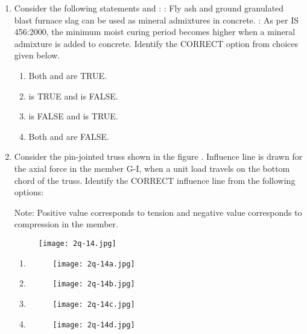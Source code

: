 \documentclass[journal,12pt,onecolumn]{article}
\theoremstyle{remark}
\begin{document}
\begin{enumerate}
    \item Consider the following statements  and :
    : Fly ash and ground granulated blast furnace slag can be used as mineral admixtures in concrete.
    : As per IS 456:2000, the minimum moist curing period becomes higher when a mineral admixture is added to concrete.
    Identify the CORRECT option from choices given below.

    \hfill{}
    \begin{enumerate}
        \item Both  and  are TRUE.
        \item {} is TRUE and  is FALSE.
        \item {} is FALSE and  is TRUE.
        \item Both  and  are FALSE.
    \end{enumerate}

    \item Consider the pin-jointed truss shown in the figure . Influence line is drawn for the axial force in the member G-I, when a unit load travels on the bottom chord of the truss. Identify the CORRECT influence line from the following options:
    
    Note: Positive value corresponds to tension and negative value corresponds to compression in the member.
    \begin{figure}[H]
        \centering
        \texttt{[image: 2q-14.jpg]}
        \caption{}
        \label{fig:q14}
    \end{figure}

    \hfill{}
    \begin{enumerate}
        \item \begin{figure}[H]
        \centering
        \texttt{[image: 2q-14a.jpg]}
        \caption{}
        \label{fig:q14}
    \end{figure}
    \item \begin{figure}[H]
        \centering
        \texttt{[image: 2q-14b.jpg]}
        \caption{}
        \label{fig:q14}
    \end{figure}
    \item \begin{figure}[H]
        \centering
        \texttt{[image: 2q-14c.jpg]}
        \caption{}
        \label{fig:q14}
    \end{figure}
    \item \begin{figure}[H]
        \centering
        \texttt{[image: 2q-14d.jpg]}
        \caption{}
        \label{fig:q14}
    \end{figure}
    \end{enumerate}


\end{enumerate}
\end{document}
